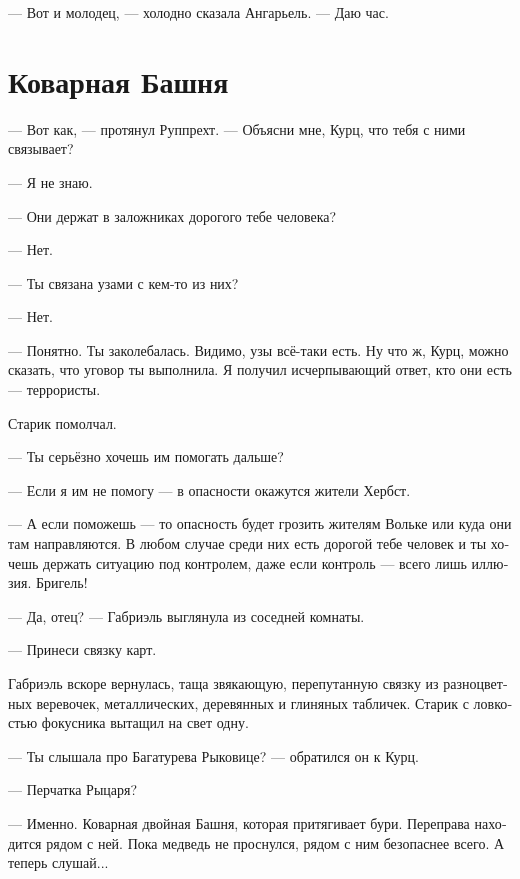 \documentclass[a4paper,12pt,fleqn]{book}\usepackage{polyglossia}\setdefaultlanguage[babelshorthands=true]{russian}\setotherlanguage{english}\defaultfontfeatures{Ligatures=TeX,Mapping=tex-text}\usepackage{xcolor}\newcommand{\ml}[3]{#2}
\begin{document}
\ml{$0$}
{--- Вот и молодец, --- холодно сказала Ангарьель.}
{``Good girl,'' Angariel coldly said.}
\ml{$0$}
{--- Даю час.}
{``You have one hour.''}

\section{Коварная Башня}

--- Вот как, --- протянул Руппрехт.
--- Объясни мне, Курц, что тебя с ними связывает?

--- Я не знаю.

--- Они держат в заложниках дорогого тебе человека?

--- Нет.

--- Ты связана узами с кем-то из них?

--- Нет.

\ml{$0$}
{--- Понятно.}
{``I see.}
\ml{$0$}
{Ты заколебалась.}
{You hesitated.}
Видимо, узы всё-таки есть.
\ml{$0$}
{Ну что ж, Курц, можно сказать, что уговор ты выполнила.}
{Well, Kurz, I can say you've done your part.}
\ml{$0$}
{Я получил исчерпывающий ответ, кто они есть --- террористы.}
{I received a full answer about who they are: terrorists.''}

Старик помолчал.

--- Ты серьёзно хочешь им помогать дальше?

--- Если я им не помогу --- в опасности окажутся жители Хербст.

--- А если поможешь --- то опасность будет грозить жителям Вольке или куда они там направляются.
В любом случае среди них есть дорогой тебе человек и ты хочешь держать ситуацию под контролем, даже если контроль --- всего лишь иллюзия.
\ml{$0$}
{Бригель!}
{Briegel!''}

--- Да, отец? --- Габриэль выглянула из соседней комнаты.

--- Принеси связку карт.

Габриэль вскоре вернулась, таща звякающую, перепутанную связку из разноцветных веревочек, металлических, деревянных и глиняных табличек.
Старик с ловкостью фокусника вытащил на свет одну.

--- Ты слышала про Багатурева Рыковице? --- обратился он к Курц.

\ml{$0$}
{--- Перчатка Рыцаря?}
{``Knight's Mitten?''}

\ml{$0$}
{--- Именно.}
{``Exactly.}
\ml{$0$}
{Коварная двойная Башня, которая притягивает бури.}
{A treacherous double Tower, which attracts storms.}
Переправа находится рядом с ней.
Пока медведь не проснулся, рядом с ним безопаснее всего.
А теперь слушай...
\end{document}
